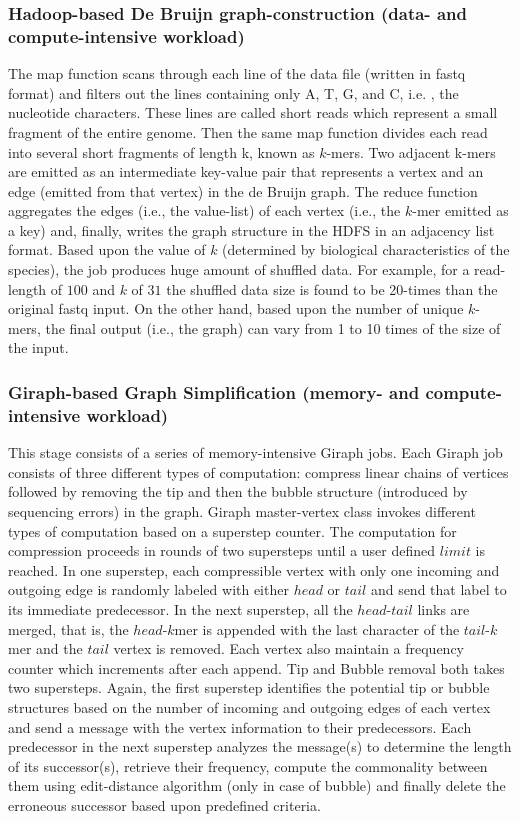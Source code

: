 \documentclass[10pt, conference, compsocconf]{IEEEtran}
\begin{document}
\subsubsection {Hadoop-based De Bruijn graph-construction (data- and compute-intensive workload)}
The map function scans through each line of the data file (written in fastq format) and filters out the lines containing only A, T, G, and C, i.e. , the nucleotide characters. These lines are called short reads which represent a small fragment of the entire genome. Then the same map function divides each read into several short fragments of length k,  known as $k$-mers. Two adjacent  k-mers are emitted as an intermediate key-value pair that represents a vertex and an edge (emitted from that vertex) in the de Bruijn graph. The reduce function aggregates the edges (i.e., the value-list) of each vertex (i.e., the $k$-mer emitted as a key) and, finally, writes the graph structure in the HDFS in an adjacency list format. Based upon the value of $k$ (determined by biological characteristics of the species), the job produces huge amount of shuffled data. For example, for a read-length of $100$ and $k$ of $31$ the shuffled data size is found to be 20-times than the original fastq input. On the other hand, based upon the number of unique $k$-mers, the final output (i.e., the graph) can vary from 1 to 10 times of the size of the input. 

\subsubsection {Giraph-based Graph Simplification (memory- and compute-intensive workload)}
This stage consists of a series of memory-intensive Giraph jobs. Each Giraph job consists of three different types of computation: compress linear chains of vertices followed by removing the tip and then the bubble structure (introduced by sequencing errors) in the graph. Giraph master-vertex class invokes different types of computation based on a superstep counter. The computation for compression proceeds in rounds of two supersteps until a user defined $limit$ is reached. In one superstep, each compressible vertex with only one incoming and outgoing edge is randomly labeled with either $head$ or $tail$ and send that label to its immediate predecessor. In the next superstep, all the $head$-$tail$ links are merged, that is, the $head$-$k$mer is appended with the last character of the $tail$-$k$mer and the $tail$ vertex is removed. Each vertex also maintain a frequency counter which increments after each append. Tip and Bubble removal both takes two supersteps. Again, the first superstep identifies the potential tip or bubble structures based on the number of incoming and outgoing edges of each vertex and send a message with the vertex information to their predecessors. Each predecessor in the next superstep analyzes the message(s) to determine the length of its successor(s), retrieve their frequency, compute the commonality between them using edit-distance algorithm (only in case of bubble) and finally delete the erroneous successor based upon predefined criteria.
\end{document}
